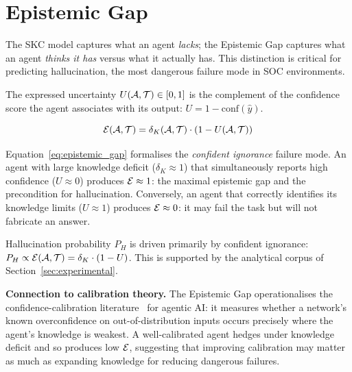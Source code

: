 \section{Epistemic Gap}
\label{sec:epistemic}

The SKC model captures what an agent \textit{lacks}; the Epistemic Gap
captures what an agent \textit{thinks it has} versus what it actually has.
This distinction is critical for predicting hallucination, the most
dangerous failure mode in SOC environments.

\begin{definition}
  The expressed uncertainty $U(\mathcal{A}, \mathcal{T}) \in [0,1]$ is the complement of
  the confidence score the agent associates with its output:
  $U = 1 - \mathrm{conf}(\hat{y})$.
\end{definition}

\begin{definition}
  \begin{equation}
    \mathcal{E}(\mathcal{A}, \mathcal{T}) = \delta_K(\mathcal{A}, \mathcal{T}) \cdot (1 - U(\mathcal{A}, \mathcal{T}))
    \label{eq:epistemic_gap}
  \end{equation}
\end{definition}

Equation~\eqref{eq:epistemic_gap} formalises the \textit{confident ignorance}
failure mode. An agent with large knowledge deficit ($\delta_K \approx 1$)
that simultaneously reports high confidence ($U \approx 0$) produces
$\mathcal{E} \approx 1$: the maximal epistemic gap and the precondition for
hallucination. Conversely, an agent that correctly identifies its knowledge
limits ($U \approx 1$) produces $\mathcal{E} \approx 0$: it may fail the task but
will not fabricate an answer.

\begin{hypothesis}
\label{hyp:hallucination}
  Hallucination probability $P_H$ is driven primarily by confident ignorance:
  $P_H \propto \mathcal{E}(\mathcal{A}, \mathcal{T}) = \delta_K \cdot (1 - U)$. This is supported
  by the analytical corpus of Section~\ref{sec:experimental}.
\end{hypothesis}

\textbf{Connection to calibration theory.}
The Epistemic Gap operationalises the confidence-calibration
literature~\cite{guo2017calibration} for agentic AI: it measures whether a
network's known overconfidence on out-of-distribution inputs occurs
precisely where the agent's knowledge is weakest. A well-calibrated agent
hedges under knowledge deficit and so produces low $\mathcal{E}$, suggesting that
improving calibration may matter as much as expanding knowledge for
reducing dangerous failures.

